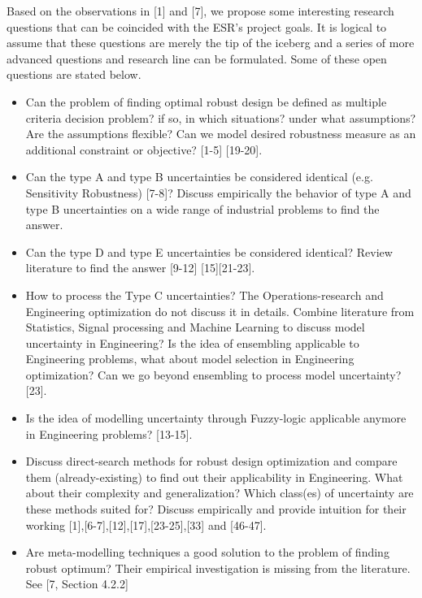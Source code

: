 Based on the observations in [1] and [7], we propose some interesting research questions that can be coincided with the ESR's project goals. It is logical to assume that these questions are merely the tip of the iceberg and a series of more advanced questions and research line can be formulated. Some of these open questions are stated below.

\begin{itemize}
	\item Can the problem of finding optimal robust design be defined as multiple criteria decision problem? if so, in which situations? under what assumptions? Are the assumptions flexible? Can we model desired robustness measure as an additional constraint or objective? [1-5] [19-20]. 
	
	\item Can the type A and type B uncertainties be considered identical (e.g. Sensitivity Robustness) [7-8]? Discuss empirically the behavior of type A and type B uncertainties on a wide range of industrial problems to find the answer. 
	
	\item Can the type D and type E uncertainties be considered identical? Review literature to find the answer [9-12] [15][21-23].
	
	\item How to process the Type C uncertainties? The Operations-research and Engineering optimization do not discuss it in details. Combine literature from Statistics, Signal processing and Machine Learning to  discuss model uncertainty in Engineering? Is the idea of ensembling applicable to Engineering problems, what about model selection in Engineering optimization? Can we go beyond ensembling to process model uncertainty? [23].
	
	\item Is the idea of modelling uncertainty through Fuzzy-logic applicable anymore in Engineering problems? [13-15].
	
	\item Discuss direct-search methods for robust design optimization and compare them (already-existing) to find out their applicability in Engineering. What about their complexity and generalization? Which class(es) of uncertainty are these methods suited for? Discuss empirically and provide intuition for their working [1],[6-7],[12],[17],[23-25],[33] and [46-47]. 
	
	\item Are meta-modelling techniques a good solution to the problem of finding robust optimum? Their empirical investigation is missing from the literature. See [7, Section 4.2.2]
	

\end{itemize}
